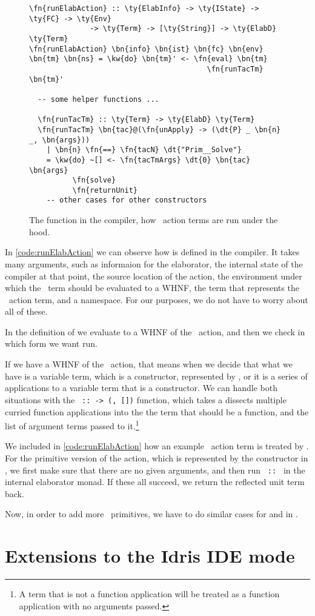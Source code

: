 \begin{figure}[ht]
\caption{The  function in the compiler, how \Elab\ action terms are run under the hood.}
\label{code:runElabAction}
\begin{Verbatim}[framesep=2mm, label=\footnotesize{\normalfont{Haskell}}, labelposition=topline]
\fn{runElabAction} :: \ty{ElabInfo} -> \ty{IState} -> \ty{FC} -> \ty{Env}
              -> \ty{Term} -> [\ty{String}] -> \ty{ElabD} \ty{Term}
\fn{runElabAction} \bn{info} \bn{ist} \bn{fc} \bn{env} \bn{tm} \bn{ns} = \kw{do} \bn{tm}' <- \fn{eval} \bn{tm}
                                         \fn{runTacTm} \bn{tm}'

  -- some helper functions ...

  \fn{runTacTm} :: \ty{Term} -> \ty{ElabD} \ty{Term}
  \fn{runTacTm} \bn{tac}@(\fn{unApply} -> (\dt{P} _ \bn{n} _, \bn{args}))
    | \bn{n} \fn{==} \fn{tacN} \dt{"Prim__Solve"}
    = \kw{do} ~[] <- \fn{tacTmArgs} \dt{0} \bn{tac} \bn{args}
          \fn{solve}
          \fn{returnUnit}
    -- other cases for other constructors
\end{Verbatim}
\end{figure}

In \autoref{code:runElabAction} we can observe how  is
defined in the compiler.
It takes many arguments, such as informaion for the elaborator, the internal
state of the compiler at that point, the source location of the action, the
environment under which the \Elab\ term should be evaluated to a WHNF, the
term that represents the \Elab\ action term, and a namespace.  For our purposes,
we do not have to worry about all of these.

In the definition of  we evaluate  to a WHNF
of the \Elab\ action, and then we check in  which form we want run.

If we have a WHNF of the \Elab\ action, that means when we decide
that what we have is a variable term, which is a constructor, represented by
, or it is a series of applications to a variable term that is a
constructor. We can handle both situations with the
\texttt{ ::  -> (, [])} function,
which takes a dissects multiple curried function applications into the the term
that should be a function, and the list of argument terms passed to
it.\footnote{A term that is not a function application will be treated as a
function application with no arguments passed.}

We included in \autoref{code:runElabAction} how an example \Elab\ action
term is treated by . For the primitive version of the 
action, which is represented by the  constructor in \Elab,
we first make sure that there are no given arguments, and then run
\texttt{ ::   \ty{()}} in the internal elaborator
monad. If these all succeed, we return the reflected unit term back.

Now, in order to add more \Elab\ primitives, we have to do similar cases for
   and  in .

\section{Extensions to the Idris IDE mode}\label{sec:idemode}
